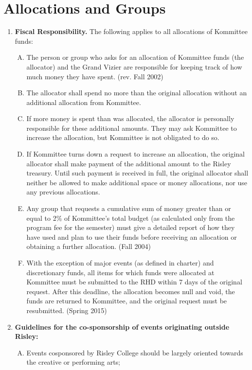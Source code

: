 \documentclass[12pt]{article}
\begin{document}
\section*{Allocations and Groups}
\begin{enumerate}[1.]
\item \textbf{Fiscal Responsibility.} The following applies to all allocations of Kommittee funds: 
\begin{enumerate}[A.]
\item The person or group who asks for an allocation of Kommittee funds (the allocator) and the Grand Vizier are responsible for keeping track of how much money they have spent. (rev. Fall 2002) 
\item The allocator shall spend no more than the original allocation without an additional allocation from Kommittee. 
\item If more money is spent than was allocated, the allocator is personally responsible for these additional amounts. They may ask Kommittee to increase the allocation, but Kommittee is not obligated to do so. 
\item If Kommittee turns down a request to increase an allocation, the original allocator shall make payment of the additional amount to the Risley treasury. Until such payment is received in full, the original allocator shall neither be allowed to make additional space or money allocations, nor use any previous allocations. 
\item Any group that requests a cumulative sum of money greater than or equal to 2\% of Kommittee's total budget (as calculated only from the program fee for the semester) must give a detailed report of how they have used and plan to use their funds before receiving an allocation or obtaining a further allocation. (Fall 2004)
\item With the exception of major events (as defined in charter) and discretionary funds, all items for which funds were allocated at Kommittee must be submitted to the RHD within 7 days of the original request. After this deadline, the allocation becomes null and void, the funds are returned to Kommittee, and the original request must be resubmitted. (Spring 2015)
\end{enumerate}
\item \textbf{Guidelines for the co-sponsorship of events originating outside Risley:}
\begin{enumerate}[A.]
\item Events cosponsored by Risley College should be largely oriented towards the creative or performing arts; 

\end{enumerate}
\end{enumerate}
\end{document}
